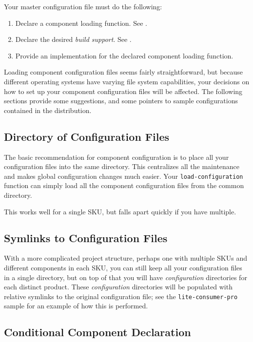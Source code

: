 Your master configuration file must do the following:

\begin{enumerate}
\item Declare a component loading function.  See
  .
\item Declare the desired \emph{build support}.  See
  .
\item Provide an implementation for the declared component loading
  function.
\end{enumerate}

Loading component configuration files seems fairly straightforward,
but because different operating systems have varying file system
capabilities, your decisions on how to set up your component
configuration files will be affected.  The following sections provide
some suggestions, and some pointers to sample configurations contained
in the \lmsbw distribution.

\subsection{Directory of Configuration Files}\label{wrap:directory}

The basic recommendation for \lmsbw component configuration is to
place all your configuration files into the same directory.  This
centralizes all the maintenance and makes global configuration changes
much easier.  Your \texttt{load-configuration} function can simply
load all the component configuration files from the common directory.

This works well for a single SKU, but falls apart quickly if you have
multiple.

\subsection{Symlinks to Configuration Files}

With a more complicated project structure, perhaps one with multiple
SKUs and different components in each SKU, you can still keep all your
configuration files in a single directory, but on top of that you will
have \emph{configuration} directories for each distinct product.
These \emph{configuration} directories will be populated with relative
symlinks to the original configuration file; see the
\texttt{lite-consumer-pro} sample for an example of how this is
performed.

\subsection{Conditional Component Declaration}


